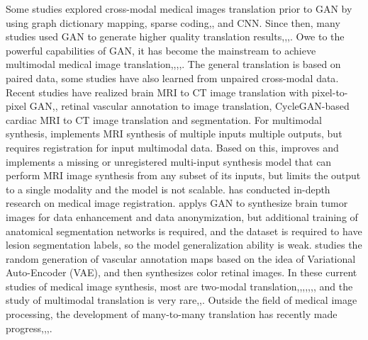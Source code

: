 \documentclass[letterpaper]{article} %
\begin{document}
Some studies explored cross-modal medical images translation prior to GAN by using graph dictionary mapping\cite{22burgos2015robust}, sparse coding\cite{33huang2017simultaneous},\cite{34vemulapalli2015unsupervised}, and CNN\cite{36vannguyen2015crossdomain}. Since then, many studies used GAN to generate higher quality translation results\cite{1zhao2018modular},\cite{5liang2018generative},\cite{6zhu2017unpaired},\cite{13choi2018stargan:}. Owe to the powerful capabilities of GAN, it has become the mainstream to achieve multimodal medical image translation\cite{2zhang2018translating},\cite{20nie2017medical},\cite{35osokin2017gans},\cite{36vannguyen2015crossdomain},\cite{40kamnitsas2017unsupervised}. The general translation is based on paired data, some studies have also learned from unpaired cross-modal data\cite{2zhang2018translating}. Recent studies have realized brain MRI to CT image translation with pixel-to-pixel GAN\cite{20nie2017medical},\cite{40kamnitsas2017unsupervised}, retinal vascular annotation to image translation\cite{41costa2017towards}, CycleGAN-based\cite{6zhu2017unpaired} cardiac MRI to CT image translation and segmentation\cite{20nie2017medical}. For multimodal synthesis, \cite{84chartsias2018multimodal} implements MRI synthesis of multiple inputs multiple outputs, but requires registration for input multimodal data. Based on this, \cite{85joyce2017robust} improves and implements a missing or unregistered multi-input synthesis model that can perform MRI image synthesis from any subset of its inputs, but limits the output to a single modality and the model is not scalable. \cite{66miao2018dilated} has conducted in-depth research on medical image registration. \cite{4shin2018medical} applys GAN to synthesize brain tumor images for data enhancement and data anonymization, but additional training of anatomical segmentation networks is required, and the dataset is required to have lesion segmentation labels, so the model generalization ability is weak. \cite{41costa2017towards} studies the random generation of vascular annotation maps based on the idea of Variational Auto-Encoder (VAE)\cite{87kingma2014auto-encoding, 88rezende2014stochastic}, and then synthesizes color retinal images. In these current studies of medical image synthesis, most are two-modal translation\cite{2zhang2018translating},\cite{20nie2017medical},\cite{22burgos2015robust},\cite{34vemulapalli2015unsupervised},\cite{35osokin2017gans},\cite{36vannguyen2015crossdomain},\cite{40kamnitsas2017unsupervised}, and the study of multimodal translation is very rare\cite{84chartsias2018multimodal},\cite{85joyce2017robust},\cite{4shin2018medical}. Outside the field of medical image processing, the development of many-to-many translation has recently made progress\cite{1zhao2018modular},\cite{5liang2018generative},\cite{13choi2018stargan:},\cite{27isola2017image-to-image}.
\end{document}
